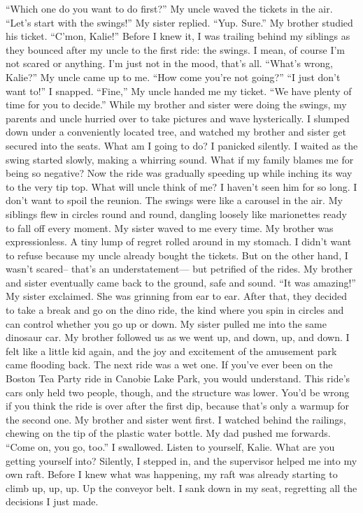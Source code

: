 \documentclass[12pt]{article}
\begin{document}
 “Which one do you want to do first?” My uncle waved the tickets in the air.  “Let’s start with the swings!” My sister replied.  “Yup. Sure.” My brother studied his ticket.  “C’mon, Kalie!”  Before I knew it, I was trailing behind my siblings as they bounced after my uncle to the  first ride: the swings. 
 I mean, of course I’m not  scared  or anything. I’m  just not in the mood, that’s all. 
 “What’s wrong, Kalie?” My uncle came up to me. “How come you’re not going?”  “I just don’t want to!” I snapped.  “Fine,” My uncle handed me my ticket. “We have plenty of time for you to decide.” 
 While my brother and sister were doing the swings, my parents and uncle hurried over to  take pictures and wave hysterically.  I slumped down under a conveniently located tree, and watched my brother and sister get  secured into the seats. 
 What am I going to do?  I panicked silently.  I waited  as the swing started slowly, making a 
 whirring  sound. 
 What if my family blames me for being so negative?  Now the ride was gradually speeding  up while inching its way to the very tip top. 
 What will uncle think of me? I haven’t seen him for so long. I don’t want to spoil the  reunion.  The swings were like a carousel in the air.  My siblings flew in circles round and round,  dangling loosely like marionettes ready to fall off every moment.  My sister waved to me every time. My brother was expressionless.  A tiny lump of regret  rolled around in my stomach. I didn’t want to refuse because my uncle already bought the  tickets. But on the other hand, I wasn’t scared– that’s an understatement— but  petrified  of the  rides.  My brother and sister eventually came back to the ground, safe and sound.  “It was amazing!” My sister exclaimed.  She was grinning  from ear to ear.  After that, they decided to take a break and go on the dino ride, the kind where you spin  in circles and can control whether you go up or down. My sister pulled me into the same  dinosaur car. My brother followed us as we went up, and down, up, and down.  I felt like a little  kid again, and the joy and excitement of the amusement park came flooding back.  The next ride was a wet one. 
 If you’ve ever been on the Boston Tea Party ride in Canobie Lake Park, you would  understand. This ride’s cars only held two people, though, and the structure was lower. You’d be  wrong if you think the ride is over after the first dip, because that’s only a warmup for the second  one.  My brother and sister went first. I watched behind the railings, chewing on the tip of the  plastic water bottle.  My dad pushed me forwards. “Come on, you go, too.”  I swallowed.  Listen to yourself, Kalie. What are you  getting yourself into?  Silently, I  stepped in, and the supervisor helped me into my own raft.  Before I knew what was happening, my raft was already starting to climb up, up, up. Up  the conveyor belt. I sank down in my seat, regretting all the decisions I just made. 
\end{document}
